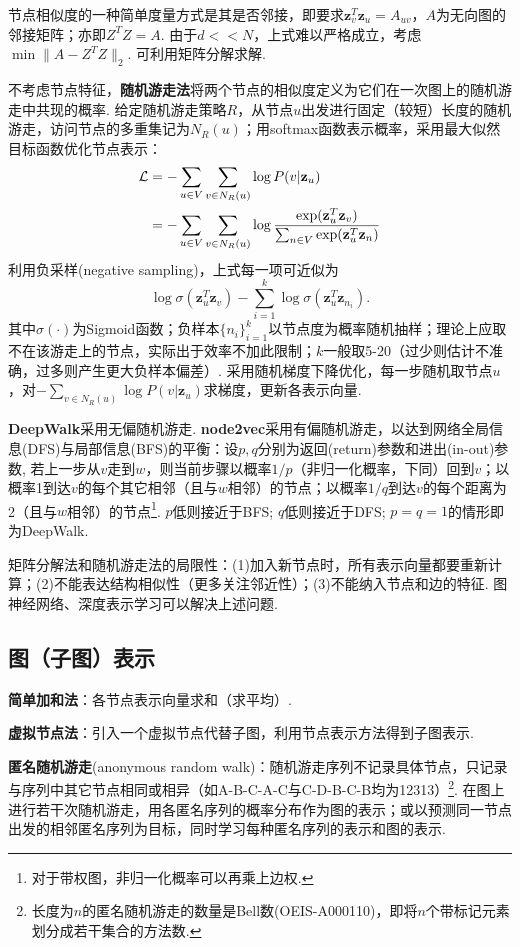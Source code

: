 \par 节点相似度的一种简单度量方式是其是否邻接，即要求$\mathbf{z}_v^T\mathbf{z}_u=A_{uv}$，$A$为无向图的邻接矩阵；亦即$Z^T Z=A$. 由于$d<<N$，上式难以严格成立，考虑$\min \|A-Z^T Z\|_2$. 可利用矩阵分解求解. 

\par 不考虑节点特征，\textbf{随机游走法}将两个节点的相似度定义为它们在一次图上的随机游走中共现的概率. 给定随机游走策略$R$，从节点$u$出发进行固定（较短）长度的随机游走，访问节点的多重集记为$N_R(u)$；用softmax函数表示概率，采用最大似然目标函数优化节点表示：
\begin{align}
\mathcal{L}&=-\sum_{u\in V}\sum_{v \in N_R(u)} \log P(v \vert \mathbf{z}_u)\notag \\
&=-\sum_{u\in V}\sum_{v \in N_R(u)}\log \frac{\exp(\mathbf{z}_u^T \mathbf{z}_v)}{\sum_{n\in V}\exp(\mathbf{z}_u^T \mathbf{z}_n)}
\end{align}
利用负采样(negative sampling)，上式每一项可近似为
\begin{equation}
    \log \sigma(\mathbf{z}_u^T \mathbf{z}_v)-\sum_{i=1}^k \log \sigma(\mathbf{z}_u^T \mathbf{z}_{n_i}).
\end{equation}
其中$\sigma(\cdot)$为Sigmoid函数；负样本$\{n_i\}_{i=1}^k$以节点度为概率随机抽样；理论上应取不在该游走上的节点，实际出于效率不加此限制；$k$一般取5-20（过少则估计不准确，过多则产生更大负样本偏差）. 采用随机梯度下降优化，每一步随机取节点$u$，对$-\sum_{v \in N_R(u)} \log P(v \vert \mathbf{z}_u)$求梯度，更新各表示向量. 

\par \textbf{DeepWalk}采用无偏随机游走. \textbf{node2vec}采用有偏随机游走，以达到网络全局信息(DFS)与局部信息(BFS)的平衡：设$p,q$分别为返回(return)参数和进出(in-out)参数, 若上一步从$v$走到$w$，则当前步骤以概率$1/p$（非归一化概率，下同）回到$v$；以概率1到达$v$的每个其它相邻（且与$w$相邻）的节点；以概率$1/q$到达$v$的每个距离为2（且与$w$相邻）的节点\footnote{对于带权图，非归一化概率可以再乘上边权.}. $p$低则接近于BFS; $q$低则接近于DFS; $p=q=1$的情形即为DeepWalk. 

\par 矩阵分解法和随机游走法的局限性：(1)加入新节点时，所有表示向量都要重新计算；(2)不能表达结构相似性（更多关注邻近性）；(3)不能纳入节点和边的特征. 图神经网络、深度表示学习可以解决上述问题. 

\subsection{图（子图）表示}
\par \textbf{简单加和法}：各节点表示向量求和（求平均）. 
\par \textbf{虚拟节点法}：引入一个虚拟节点代替子图，利用节点表示方法得到子图表示. 
\par \textbf{匿名随机游走}(anonymous random walk)：随机游走序列不记录具体节点，只记录与序列中其它节点相同或相异（如A-B-C-A-C与C-D-B-C-B均为12313）\footnote{长度为$n$的匿名随机游走的数量是Bell数(OEIS-A000110)，即将$n$个带标记元素划分成若干集合的方法数. }. 在图上进行若干次随机游走，用各匿名序列的概率分布作为图的表示；或以预测同一节点出发的相邻匿名序列为目标，同时学习每种匿名序列的表示和图的表示. 

